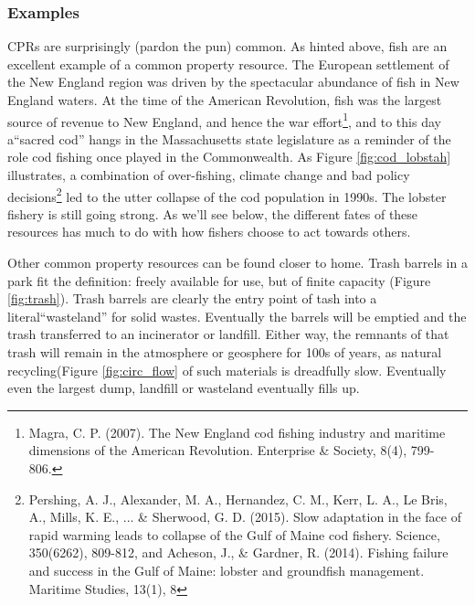 \subsubsection{Examples}
CPRs are surprisingly (pardon the pun) common. As hinted above, fish are an excellent example of a common property resource. The European settlement of the New England region was driven by the spectacular abundance of fish in New England waters. At the time of the American Revolution, fish was the largest source of revenue to New England, and hence the war effort\footnote{Magra, C. P. (2007). The New England cod fishing industry and maritime dimensions of the American Revolution. Enterprise \& Society, 8(4), 799-806.}, and to this day a``sacred cod'' hangs in the Massachusetts state legislature as a reminder of the role cod fishing once played in the Commonwealth. As Figure \ref{fig:cod_lobstah} illustrates, a combination of over-fishing, climate change and bad policy decisions\footnote{Pershing, A. J., Alexander, M. A., Hernandez, C. M., Kerr, L. A., Le Bris, A., Mills, K. E., ... \& Sherwood, G. D. (2015). Slow adaptation in the face of rapid warming leads to collapse of the Gulf of Maine cod fishery. Science, 350(6262), 809-812, and Acheson, J., \& Gardner, R. (2014). Fishing failure and success in the Gulf of Maine: lobster and groundfish management. Maritime Studies, 13(1), 8} led to the utter collapse of the cod population in 1990s. The lobster fishery is still going strong. As we'll see below, the different fates of these resources has much to do with how fishers choose to act towards others.

Other common property resources can be found closer to home. Trash barrels in a park fit the definition:  freely available for use, but of finite capacity (Figure \ref{fig:trash}). Trash barrels are clearly the entry point of tash into a literal``wasteland'' for solid wastes. Eventually the barrels will be emptied and the trash transferred to an incinerator or landfill. Either way, the remnants of that trash will remain in the atmosphere or geosphere for 100s of years, as natural recycling(Figure \ref{fig:circ_flow} of such materials is dreadfully slow. Eventually even the largest dump, landfill or wasteland eventually fills up.\\

